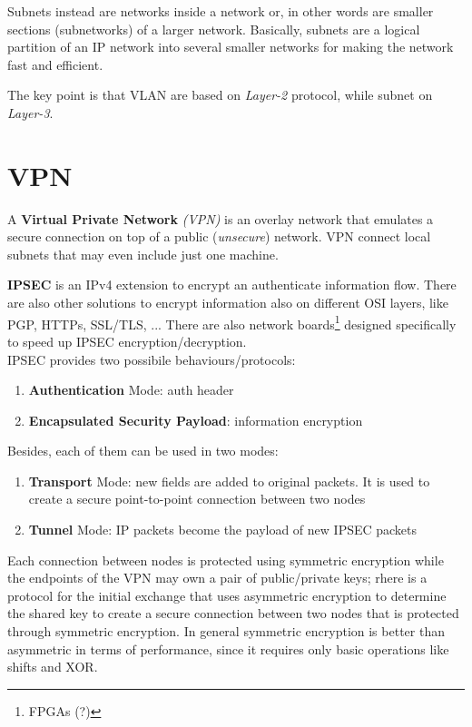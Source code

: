 Subnets instead are networks inside a network or, in other words are smaller sections (subnetworks) of a larger network.
Basically, subnets are a logical partition of an IP network into several smaller
networks for making the network fast and efficient.

The key point is that VLAN are based on \textit{Layer-2} protocol, while subnet on \textit{Layer-3}.

\section{VPN}
A \textbf{Virtual Private Network} \textit{(VPN)} is an overlay network that emulates a secure connection on top of a public (\textit{unsecure}) network.
VPN connect local subnets that may even include just one machine.

\textbf{IPSEC} is an IPv4 extension to encrypt an authenticate information flow.
There are also other solutions to encrypt information also on different OSI layers, like PGP, HTTPs, SSL/TLS, ...
There are also network boards\footnote{FPGAs (?)} designed specifically to speed up IPSEC encryption/decryption.\\
IPSEC provides two possibile behaviours/protocols:
\begin{enumerate}
   \item \textbf{Authentication} Mode: auth header
   \item \textbf{Encapsulated Security Payload}: information encryption
\end{enumerate}
Besides, each of them can be used in two modes:
\begin{enumerate}
   \item \textbf{Transport} Mode: new fields are added to original packets.
   It is used to create a secure point-to-point connection between two nodes
   \item \textbf{Tunnel} Mode: IP packets become the payload of new IPSEC packets
\end{enumerate}


Each connection between nodes is protected using symmetric encryption while
the endpoints of the VPN may own a pair of public/private keys;
rhere is a protocol for the initial exchange that uses asymmetric encryption to
determine the shared key to create a secure connection between two nodes
that is protected through symmetric encryption.
In general symmetric encryption is better than asymmetric in terms of performance,
since it requires only basic operations like shifts and XOR.\nl

